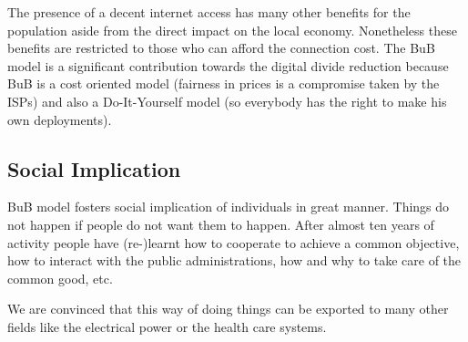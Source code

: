The presence of a decent internet access has many other benefits for the population aside from the direct impact on the local economy. Nonetheless these benefits are restricted to those who can afford the connection cost. The BuB model is a significant contribution towards the digital divide reduction because BuB is a cost oriented model (fairness in prices is a compromise taken by the ISPs) and also a Do-It-Yourself model (so everybody has the right to make his own deployments).


\FloatBarrier
\subsection{Social Implication}
\label{res_social}

BuB model fosters social implication of individuals in great manner. Things do not happen if people do not want them to happen. After almost ten years of activity people have (re-)learnt how to cooperate to achieve a common objective, how to interact with the public administrations, how and why to take care of the common good, etc.

We are convinced that this way of doing things can be exported to many other fields like the electrical power or the health care systems.

